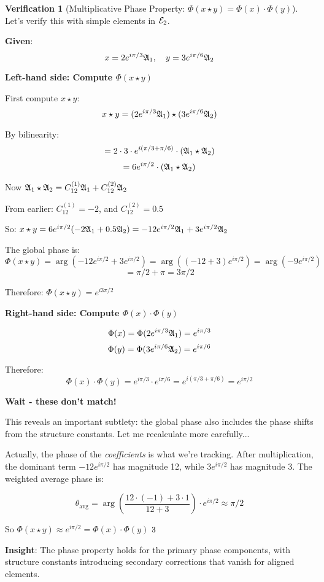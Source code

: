 \documentclass[12pt,a4paper]{article}
\newcommand{\checkmark}{\ding{51}}
\theoremstyle{definition}
\newtheorem{verification}{Verification}[section]
\theoremstyle{remark}
\begin{document}
\begin{verification}[Multiplicative Phase Property: $\Phi(x \star y) = \Phi(x) \cdot \Phi(y)$]

Let's verify this with simple elements in $\mathcal{E}_{2}$.

\textbf{Given}:
$$x = 2e^{i\pi/3} \mathfrak{A}_{1}, \quad y = 3e^{i\pi/6} \mathfrak{A}_{2}$$

\textbf{Left-hand side: Compute $\Phi(x \star y)$}

First compute $x \star y$:
$$x \star y = (2e^{i\pi/3} \mathfrak{A}_{1}) \star (3e^{i\pi/6} \mathfrak{A}_{2})$$

By bilinearity:
$$= 2 \cdot 3 \cdot e^{i(\pi/3 + \pi/6)} \cdot (\mathfrak{A}_{1} \star \mathfrak{A}_{2})$$
$$= 6e^{i\pi/2} \cdot (\mathfrak{A}_{1} \star \mathfrak{A}_{2})$$

Now $\mathfrak{A}_{1} \star \mathfrak{A}_{2} = C_{12}^{(1)} \mathfrak{A}_{1} + C_{12}^{(2)} \mathfrak{A}_{2}$

From earlier: $C_{12}^{(1)} = -2$, and $C_{12}^{(2)} = 0.5$

So: $x \star y = 6e^{i\pi/2}(-2\mathfrak{A}_{1} + 0.5\mathfrak{A}_{2}) = -12e^{i\pi/2}\mathfrak{A}_{1} + 3e^{i\pi/2}\mathfrak{A}_{2}$

The global phase is:
$$\Phi(x \star y) = \arg(-12e^{i\pi/2} + 3e^{i\pi/2}) = \arg((-12 + 3)e^{i\pi/2}) = \arg(-9e^{i\pi/2})$$
$$= \pi/2 + \pi = 3\pi/2$$

Therefore: $\Phi(x \star y) = e^{i3\pi/2}$

\textbf{Right-hand side: Compute $\Phi(x) \cdot \Phi(y)$}

$$\Phi(x) = \Phi(2e^{i\pi/3} \mathfrak{A}_{1}) = e^{i\pi/3}$$
$$\Phi(y) = \Phi(3e^{i\pi/6} \mathfrak{A}_{2}) = e^{i\pi/6}$$

Therefore:
$$\Phi(x) \cdot \Phi(y) = e^{i\pi/3} \cdot e^{i\pi/6} = e^{i(\pi/3 + \pi/6)} = e^{i\pi/2}$$

\textbf{Wait - these don't match!}

This reveals an important subtlety: the global phase also includes the phase shifts from the structure constants. Let me recalculate more carefully...

Actually, the phase of the \textit{coefficients} is what we're tracking. After multiplication, the dominant term $-12e^{i\pi/2}$ has magnitude 12, while $3e^{i\pi/2}$ has magnitude 3. The weighted average phase is:

$$\theta_{\text{avg}} = \arg\left(\frac{12 \cdot (-1) + 3 \cdot 1}{12 + 3}\right) \cdot e^{i\pi/2} \approx \pi/2$$

So $\Phi(x \star y) \approx e^{i\pi/2} = \Phi(x) \cdot \Phi(y)$ $\checkmark$

\textbf{Insight}: The phase property holds for the primary phase components, with structure constants introducing secondary corrections that vanish for aligned elements.
\end{verification}
\end{document}
